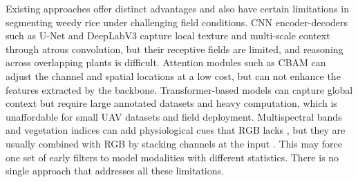 \documentclass[pdflatex,sn-mathphys-num]{sn-jnl}
\newenvironment{revblock}{\color{revisionblue}}{}
\begin{document}
\begin{revblock}
Existing approaches offer distinct advantages and also have certain limitations in segmenting weedy rice under challenging field conditions. CNN encoder-decoders such as U-Net and DeepLabV3 capture local texture and multi-scale context through atrous convolution, but their receptive fields are limited, and reasoning across overlapping plants is difficult. Attention modules such as CBAM can adjust the channel and spatial locations at a low cost, but can not enhance the features extracted by the backbone. Transformer-based models can capture global context but require large annotated datasets and heavy computation, which is unaffordable for small UAV datasets and field deployment. Multispectral bands and vegetation indices can add physiological cues that RGB lacks \cite{ma2024vegetation_dl}, but they are usually combined with RGB by stacking channels at the input \cite{li2022attention_agriculture,yang2025rshrnet}. This may force one set of early filters to model modalities with different statistics. There is no single approach that addresses all these limitations.

\end{revblock}
\end{document}
